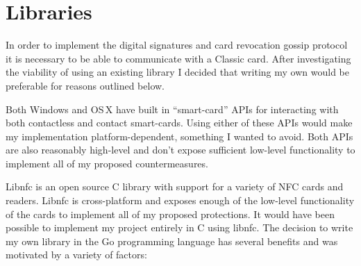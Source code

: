 \documentclass[dissertation.tex]{subfiles}
\begin{document}
  \section{\mifare{} Libraries}
  In order to implement the digital signatures and card revocation gossip protocol it is necessary to be able to communicate with a \mifare{} Classic card. After investigating the viability of using an existing \mifare{} library I decided that writing my own would be preferable for reasons outlined below.

  Both Windows and OS\,X have built in ``smart-card'' APIs for interacting with both contactless and contact smart-cards. Using either of these APIs would make my implementation platform-dependent, something I wanted to avoid. Both APIs are also reasonably high-level and don't expose sufficient   low-level functionality to implement all of my proposed countermeasures.

  Libnfc is an open source C library with support for a variety of NFC cards and readers. Libnfc is cross-platform and exposes enough of the low-level functionality of the cards to implement all of my proposed protections. It would have been possible to implement my project entirely in C using libnfc. The decision to write my own library in the Go programming language has several benefits and was motivated by a variety of factors:
\end{document}
